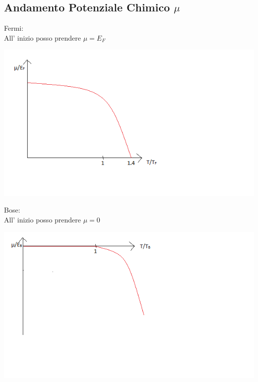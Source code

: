 \subsection{Andamento Potenziale Chimico $\mu$}
Fermi:\\
All' inizio posso prendere $\mu=E_{F}$
\begin{center}
\includegraphics[scale=1]{immagini/pot-chimico-fermi.png} 
\end{center}
Bose:\\
All' inizio posso prendere $\mu=0$
\begin{center}
\includegraphics[scale=1]{immagini/pot-chimico-bose.png}
\end{center}

